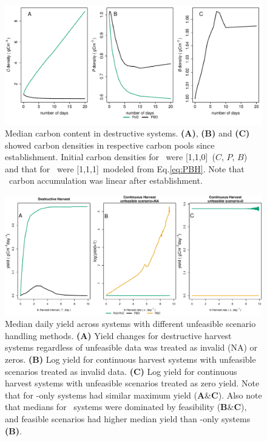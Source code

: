 \documentclass[../thesis.tex]{subfiles} %
\begin{document}
\begin{figure}[H]
    \centering
    \includegraphics[width=\linewidth]{result/Sample.pdf}
    \caption[Median carbon content in destructive systems]{Median carbon content in destructive systems.  \textbf{(A)}, \textbf{(B)} and \textbf{(C)} showed carbon densities in respective carbon pools since establishment.  Initial carbon densities for \PoN\ were [1,1,0]\den\ ($C$, $P$, $B$) and that for \PBN\ were [1,1,1]\den\ modeled from Eq.\ref{eq:PBH}.  Note that \PoN\ carbon accumulation was linear after establishment.}
    \label{f:destCarbon}
\end{figure}

\begin{figure}[H]
    \centering
    \includegraphics[width=\linewidth]{result/DailyYield.pdf}
    \caption[Median daily yield across systems]{Median daily yield across systems with different unfeasible scenario handling methods.  \textbf{(A)} Yield changes for destructive harvest systems regardless of unfeasible data was treated as invalid (NA) or zeros.  \textbf{(B)} Log yield for continuous harvest systems with unfeasible scenarios treated as invalid data.  \textbf{(C)} Log yield for continuous harvest systems with unfeasible scenarios treated as zero yield.  Note that for \phy-only systems had similar maximum yield (\textbf{A}\&\textbf{C}).  Also note that medians for \PBH\ systems were dominated by feasibility  (\textbf{B}\&\textbf{C}), and feasible scenarios had higher median yield than \phy-only systems \textbf{(B)}.}
    \label{f:ydDaily}
\end{figure}
\end{document}
